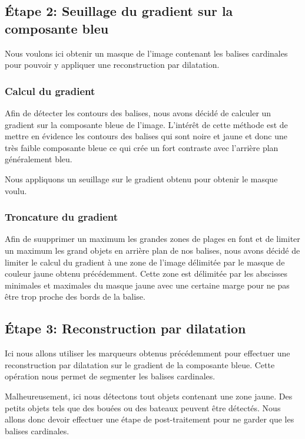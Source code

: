 \documentclass{article}
\begin{document}
\subsection{Étape 2: Seuillage du gradient sur la composante bleu}

Nous voulons ici obtenir un masque de l'image contenant les balises cardinales
pour pouvoir y appliquer une reconstruction par dilatation.

\subsubsection{Calcul du gradient}
Afin de détecter les contours des balises, nous avons décidé de calculer un
gradient sur la composante bleue de l'image. L'intérêt de cette méthode est de
mettre en évidence les contours des balises qui sont noire et jaune et donc une
très faible composante bleue ce qui crée un fort contraste avec l'arrière plan
généralement bleu.

Nous appliquons un seuillage sur le gradient obtenu pour obtenir le masque
voulu.

\subsubsection{Troncature du gradient}
Afin de suupprimer un maximum les grandes zones de plages en font et de limiter
un maximum les grand objets en arrière plan de nos balises, nous avons décidé
de limiter le calcul du gradient à une zone de l'image délimitée par le masque
de couleur jaune obtenu précédemment. Cette zone est délimitée par les
abscisses minimales et maximales du masque jaune avec une certaine marge pour
ne pas être trop proche des bords de la balise.

\subsection{Étape 3: Reconstruction par dilatation}

Ici nous allons utiliser les marqueurs obtenus précédemment pour effectuer une
reconstruction par dilatation sur le gradient de la composante bleue. Cette
opération nous permet de segmenter les balises cardinales.

Malheureusement, ici nous détectons tout objets contenant une zone jaune. Des
petits objets tels que des bouées ou des bateaux peuvent être détectés. Nous
allons donc devoir effectuer une étape de post-traitement pour ne garder que
les balises cardinales.
\end{document}
